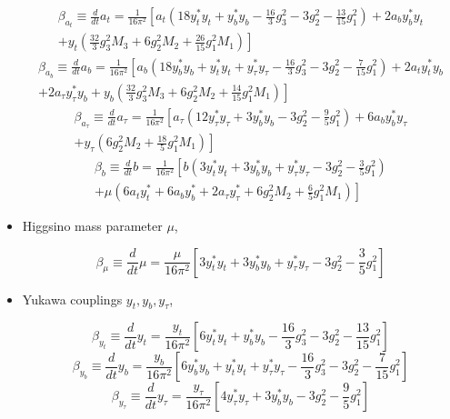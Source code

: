 \begin{itemize}
\begin{fleqn}
\begin{align}
\beta_{a_t} \equiv \frac{d}{dt}a_t=\frac{1}{16\pi^2}\left[a_t\left(18y^*_ty_t+y^*_by_b-\frac{16}{3}g^2_3-3g^2_2-\frac{13}{15}g^2_1\right)+2a_by^*_by_t \right. \nonumber \\
 \left.+y_t\left(\frac{32}{3}g^2_3M_3+6g^2_2M_2+\frac{26}{15}g^2_1M_1\right)\right]
\end{align}
\begin{align}
\beta_{a_b} \equiv \frac{d}{dt}a_b=\frac{1}{16\pi^2}\left[a_b\left(18y^*_by_b+y^*_ty_t+y^*_{\tau}y_{\tau}-\frac{16}{3}g^2_3-3g^2_2-\frac{7}{15}g^2_1\right)+2a_ty^*_ty_b \right. \nonumber \\
\left.+2a_{\tau}y^*_{\tau}y_b+y_b\left(\frac{32}{3}g^2_3M_3+6g^2_2M_2+\frac{14}{15}g^2_1M_1\right)\right]
\end{align}
\begin{align}
\beta_{a_{\tau}} \equiv \frac{d}{dt}a_{\tau}=\frac{1}{16\pi^2}\left[a_{\tau}\left(12y^*_{\tau}y_{\tau}+3y^*_by_b-3g^2_2-\frac{9}{5}g^2_1\right)+6a_by^*_by_{\tau}\right. \nonumber \\
\left.+y_{\tau}\left(6g^2_2M_2+\frac{18}{5}g^2_1M_1\right)\right]
\end{align}
\begin{align}
\beta_{b} \equiv \frac{d}{dt}b=\frac{1}{16\pi^2}\left[b\left(3y^*_ty_t+3y^*_by_b+y^*_{\tau}y_{\tau}-3g^2_2-\frac{3}{5}g^2_1\right)\right. \nonumber \\
+\left.\mu\left(6a_ty^*_t+6a_by^*_b+2a_{\tau}y^*_{\tau}+6g^2_2M_2+\frac{6}{5}g^2_1M_1\right)\right]
\end{align}
\end{fleqn}

\item Higgsino mass parameter $\mu$,

\begin{fleqn}
\begin{equation}
\beta_{\mu} \equiv \frac{d}{dt}\mu=\frac{\mu}{16\pi^2}\left[3y^*_ty_t+3y^*_by_b+y^*_{\tau}y_{\tau}-3g^2_2-\frac{3}{5}g^2_1\right]
\end{equation}
\end{fleqn}

\item Yukawa couplings $y_{t},y_{b},y_{\tau}$,

\begin{fleqn}
\begin{equation}
\beta_{y_t} \equiv \frac{d}{dt}y_t=\frac{y_t}{16\pi^2}\left[6y^*_{t}y_{t}+y^*_{b}y_{b}-\frac{16}{3}g^2_{3}-3g^2_{2}-\frac{13}{15}g^2_{1}\right]
\end{equation}
\begin{equation}
\beta_{y_b} \equiv \frac{d}{dt}y_b=\frac{y_b}{16\pi^2}\left[6y^*_{b}y_{b}+y^*_{t}y_{t}+y^*_{\tau}y_{\tau}-\frac{16}{3}g^2_{3}-3g^2_{2}-\frac{7}{15}g^2_{1}\right]
\end{equation}
\begin{equation}
\beta_{y_{\tau}} \equiv \frac{d}{dt}y_{\tau}=\frac{y_{\tau}}{16\pi^2}\left[4y^*_{\tau}y_{\tau}+3y^*_{b}y_{b}-3g^2_{2}-\frac{9}{5}g^2_{1}\right]
\end{equation}
\end{fleqn}


\end{itemize}
